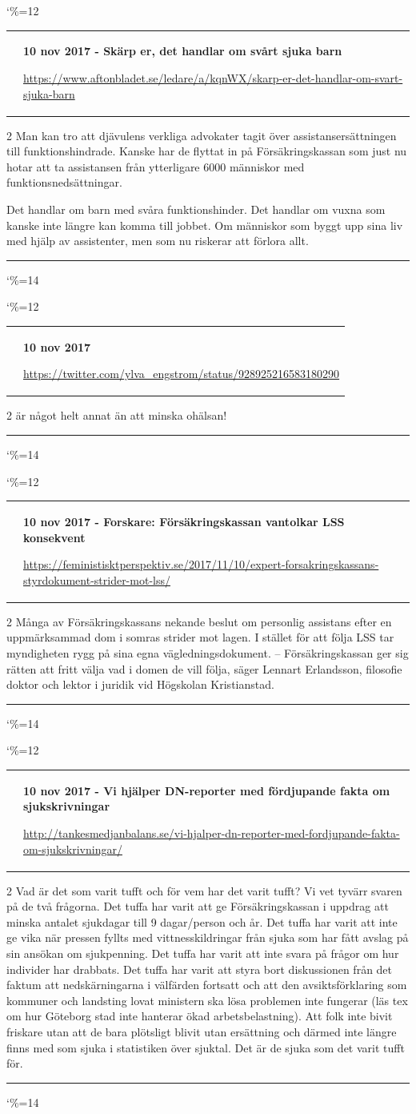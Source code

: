 \documentclass[a4paper]{article}
\makeatletter
\newcommand{\entry}{
\catcode`\%=12
\@entry}
\newcommand{\@entry}[4][]{
\bigskip
\begin{tabular*}{\textwidth}{l m{\textwidth-4cm}}
\qrcode{#4} & \textbf{#2}

\medskip

\url{#4}

\end{tabular*}

\medskip


\begin{multicols}{2}
#3
\end{multicols}

#1

\medskip
\hrule

\catcode`\%=14
}
\makeatother
\begin{document}
{{{{{\entry{10 nov 2017 - Skärp er, det handlar om svårt sjuka barn}{Man kan tro att djävulens verkliga advokater tagit över assistansersättningen till funktionshindrade. Kanske har de flyttat in på Försäkringskassan som just nu hotar att ta assistansen från ytterligare 6000 människor med funktionsnedsättningar.

Det handlar om barn med svåra funktionshinder. Det handlar om vuxna som kanske inte längre kan komma till jobbet. Om människor som byggt upp sina liv med hjälp av assistenter, men som nu riskerar att förlora allt.}{https://www.aftonbladet.se/ledare/a/kqnWX/skarp-er-det-handlar-om-svart-sjuka-barn}

\entry{10 nov 2017}{ är något helt annat än att minska ohälsan!}{https://twitter.com/ylva_engstrom/status/928925216583180290}

\entry{10 nov 2017 - Forskare: Försäkringskassan vantolkar LSS konsekvent}{Många av Försäkringskassans nekande beslut om personlig assistans efter en uppmärksammad dom i somras strider mot lagen. I stället för att följa LSS tar myndigheten rygg på sina egna vägledningsdokument.
– Försäkringskassan ger sig rätten att fritt välja vad i domen de vill följa, säger Lennart Erlandsson, filosofie doktor och lektor i juridik vid Högskolan Kristianstad.}{https://feministisktperspektiv.se/2017/11/10/expert-forsakringskassans-styrdokument-strider-mot-lss/}

\entry{10 nov 2017 - Vi hjälper DN-reporter med fördjupande fakta om sjukskrivningar}{Vad är det som varit tufft och för vem har det varit tufft? Vi vet tyvärr svaren på de två frågorna. Det tuffa har varit att ge Försäkringskassan i uppdrag att minska antalet sjukdagar till 9 dagar/person och år. Det tuffa har varit att inte ge vika när pressen fyllts med vittnesskildringar från sjuka som har fått avslag på sin ansökan om sjukpenning. Det tuffa har varit att inte svara på frågor om hur individer har drabbats. Det tuffa har varit att styra bort diskussionen från det faktum att nedskärningarna i välfärden fortsatt och att den avsiktsförklaring som kommuner och landsting lovat ministern ska lösa problemen inte fungerar (läs tex om hur Göteborg stad inte hanterar ökad arbetsbelastning). Att folk inte bivit friskare utan att de bara plötsligt blivit utan ersättning och därmed inte längre finns med som sjuka i statistiken över sjuktal. Det är de sjuka som det varit tufft för.}{http://tankesmedjanbalans.se/vi-hjalper-dn-reporter-med-fordjupande-fakta-om-sjukskrivningar/}

}}}}}
\end{document}
